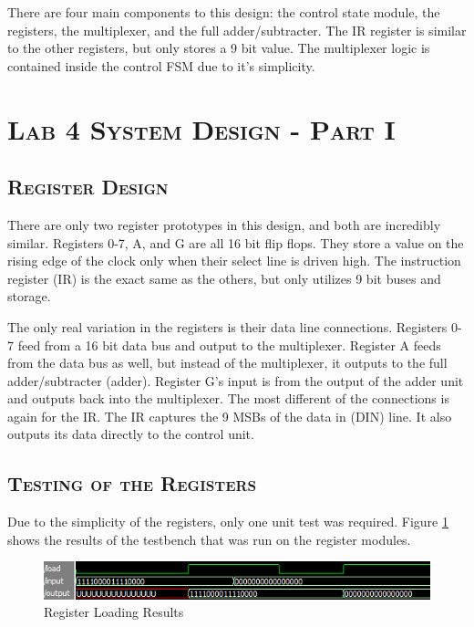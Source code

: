 \documentclass[11pt]{report}
\begin{document}
\begin{spacing}{1.5}
There are four main components to this design: the control state module, the registers, the multiplexer, and the full adder/subtracter.  The IR register is similar to the other registers, but only stores a 9 bit value.  The multiplexer logic is contained inside the control FSM due to it's simplicity.

\clearpage

\section*{\scshape Lab 4 System Design - Part I} %
\label{sec:fsm_design}

\setcounter{section}{1}
\setcounter{subsection}{0}
\subsection{\scshape Register Design}
\label{sub:design_piso}

There are only two register prototypes in this design, and both are incredibly similar.  Registers 0-7, A, and G are all 16 bit flip flops.  They store a value on the rising edge of the clock only when their select line is driven high.  The instruction register (IR) is the exact same as the others, but only utilizes 9 bit buses and storage.

The only real variation in the registers is their data line connections.  Registers 0-7 feed from a 16 bit data bus and output to the multiplexer.  Register A feeds from the data bus as well, but instead of the multiplexer, it outputs to the full adder/subtracter (adder).  Register G's input is from the output of the adder unit and outputs back into the multiplexer.  The most different of the connections is again for the IR.  The IR captures the 9 MSBs of the data in (DIN) line.  It also outputs its data directly to the control unit.

\subsection{\scshape Testing of the Registers}
\label{sub:test_piso}

Due to the simplicity of the registers, only one unit test was required.  Figure \ref{fig:register} shows the results of the testbench that was run on the register modules.

\vspace{15px}
\begin{figure}[H]
    \centering
    \includegraphics[width=1.0\textwidth,keepaspectratio]{tb_reg.png}
    \caption{Register Loading Results}
    \label{fig:register}
\end{figure}


\end{spacing}
\end{document}
